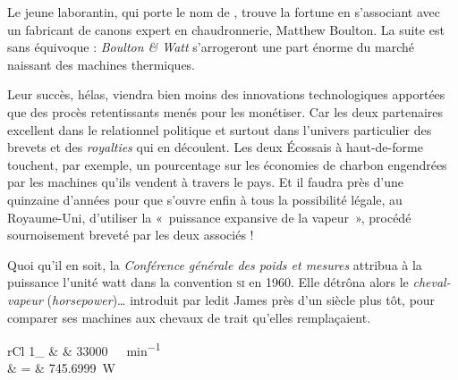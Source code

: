 	Le jeune laborantin, qui porte le nom de , trouve la fortune en s’associant avec un fabricant de canons expert en chaudronnerie, Matthew \mbox{Boulton}. La suite est sans équivoque : \textit{Boulton \& Watt} s’arrogeront une part énorme du marché naissant des machines thermiques.

	Leur succès, hélas, viendra bien moins des innovations technologiques apportées que des procès retentissants menés pour les monétiser. Car les deux partenaires excellent dans le relationnel politique et surtout dans l’univers particulier des brevets et des \textit{royalties} qui en découlent. Les deux Écossais à haut-de-forme touchent, par exemple, un pourcentage sur les économies de charbon engendrées par les machines qu’ils vendent à travers le pays. Et il faudra près d’une quinzaine d’années pour que s’ouvre enfin à tous la possibilité légale, au Royaume-Uni, d’utiliser la «~puissance expansive de la vapeur~», procédé sournoisement breveté par les deux associés !

	Quoi qu’il en soit, la \textit{Conférence générale des poids et mesures} attribua à la puissance l’unité \si{watt} dans la convention \textsc{si} en 1960. Elle détrôna alors le \emph{cheval-vapeur} (\textit{horsepower})… introduit par ledit James près d’un siècle plus tôt, pour comparer ses machines aux chevaux de trait qu’elles remplaçaient.
	\begin{IEEEeqnarray*}{rCl}
		\SI{1}{\cheval}_ 	& \equiv & \SI{33 000}{\foot\lbf\per\minute}\\
													& = & \SI{745.6999}{\watt}
	\end{IEEEeqnarray*}
	
\atendofhistorysection
